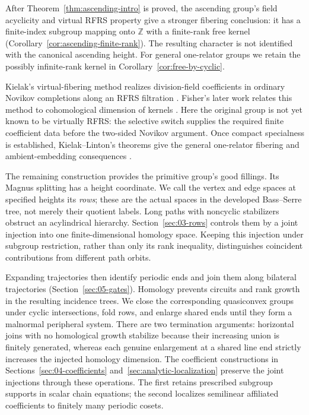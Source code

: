 After Theorem~\ref{thm:ascending-intro} is proved, the ascending group's
field acyclicity and virtual RFRS property give a stronger fibering
conclusion: it has a finite-index subgroup mapping onto $\mathbb Z$
with a finite-rank free kernel
(Corollary~\ref{cor:ascending-finite-rank}). The resulting character is
not identified with the canonical ascending height. For general one-relator groups we
retain the possibly infinite-rank kernel in
Corollary~\ref{cor:free-by-cyclic}.

Kielak's virtual-fibering method realizes division-field coefficients
in ordinary Novikov completions along an RFRS filtration
\cite[Section~4.2 and Theorem~5.2]{Kielak2020}. Fisher's later work
relates this method to cohomological dimension of kernels
\cite{Fisher2026Kernels}. Here the original group is not yet known to
be virtually RFRS: the selective switch supplies the required finite
coefficient data before the two-sided Novikov argument. Once compact
specialness is established, Kielak--Linton's theorems give the general
one-relator fibering and ambient-embedding consequences
\cite{KielakLinton2024Virtually}.

The remaining construction provides the primitive group's good
fillings. Its Magnus splitting has a height coordinate. We call the
vertex and edge spaces at specified heights its \emph{rows}; these are
the actual spaces in the developed Bass--Serre tree, not merely their
quotient labels. Long paths with noncyclic stabilizers obstruct an
acylindrical hierarchy. Section~\ref{sec:03-rows} controls them by a
joint injection into one finite-dimensional homology space. Keeping
this injection under subgroup restriction, rather than only its rank
inequality, distinguishes coincident contributions from different
path orbits.

Expanding trajectories then identify periodic ends and join them
along bilateral trajectories (Section~\ref{sec:05-gates}). Homology
prevents circuits and rank growth in the resulting incidence trees.
We close the corresponding quasiconvex groups under cyclic
intersections, fold rows, and enlarge shared ends until they form a
malnormal peripheral system. There are two termination arguments:
horizontal joins with no homological growth stabilize because their
increasing union is finitely generated, whereas each genuine
enlargement at a shared line end strictly increases the injected
homology dimension. The
coefficient constructions in Sections~\ref{sec:04-coefficients}
and~\ref{sec:analytic-localization} preserve the joint injections
through these operations. The first retains prescribed subgroup
supports in scalar chain equations; the second localizes semilinear
affiliated coefficients to finitely many periodic cosets.

